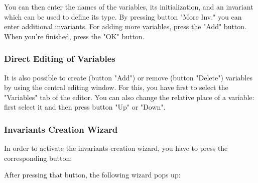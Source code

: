 You can then enter the names of the variables, its initialization, and an invariant which can be used to define its type. By pressing button "More Inv." you can enter additional invariants. For adding more variables, press the "Add" button. When you’re finished, press the "OK" button. 

\subsubsection{Direct Editing of Variables}

It is also possible to create (button "Add") or remove (button "Delete") variables by using the central editing window. For this, you have first to select the "Variables" tab of the editor. You can also change the relative place of a variable: first select it and then press button "Up" or "Down". 


\subsubsection{Invariants Creation Wizard}

In order to activate the invariants creation wizard, you have to press the corresponding button:


After pressing that button, the following wizard pops up: 


